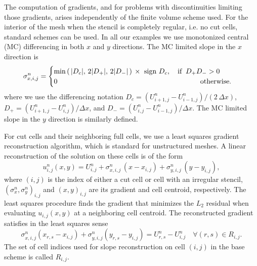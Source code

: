 The computation of gradients, and for problems with discontinuities limiting
those gradients, arises independently of the finite volume scheme used. 
For the interior of the mesh when the stencil is completely regular, i.e. no cut
cells, standard schemes can be used.
In all our examples we use monotonized central (MC) differencing in both $x$ and $y$ directions.  The MC limited slope in the $x$ direction is
\begin{equation}
\sigma^n_{x,i,j} =  \begin{cases} 
\min \left ( \,  \lvert{ D_c}\rvert,\,
2 \lvert {D_+}\rvert,\,
2 \lvert{D_-}\rvert \,  \right ) \,\times 
\text{ sign } D_c, \quad \text{if} \;\;  D_+ D_- >  0\\
0 \hspace*{2.8in} \text{otherwise}.
\end{cases}
\end{equation}
where we use the differencing notation
$D_c = (U^n_{i+1,j}-U^n_{i-1,j})/(2 \, \Delta x)$,
$D_+ = (U^n_{i+1,j}-U^n_{i,j})/\Delta x$, and
$D_- = (U^n_{i,j}-U^n_{i-1,j})/\Delta x$.  The MC limited slope in the $y$ direction is similarly defined.

For cut cells and their neighboring full cells, we use a least squares gradient reconstruction algorithm, which is standard for unstructured meshes.
A linear reconstruction of the solution on these cells is of the form
\begin{equation}
u^n_{i,j}(x,y) = U_{i,j}^n + \sigma^n_{x,i,j} \,(x-x_{i,j}) +
                     \sigma^n_{y,i,j}\,(y-y_{i,j}),
\label{eqn:lls}
\end{equation}
where $(i,j)$ is the index of either a cut cell or cell with an irregular stencil, $(\sigma^n_{x},\sigma^n_{y})_{i,j}$ and $(x,y)_{i,j}$ are its gradient and cell centroid, respectively. The least squares procedure finds the gradient that minimizes the $L_2$ residual when evaluating  $u_{i,j}(x,y)$ at a neighboring cell centroid.  
The reconstructed gradient satisfies in the least squares sense
\begin{equation}\label{eqn:linrecon_base}
\sigma^n_{x,i,j}(x_{r,s} - x_{i,j}) +
\sigma^n_{y,i,j}(y_{r,s} - y_{i,j})=
U^n_{r,s} - U^n_{i, j} \quad \forall (r,s) \in R_{i,j}.
\end{equation}
The set of cell indices used for slope reconstruction on cell $(i,j)$ in the base scheme is called $R_{i,j}$.

